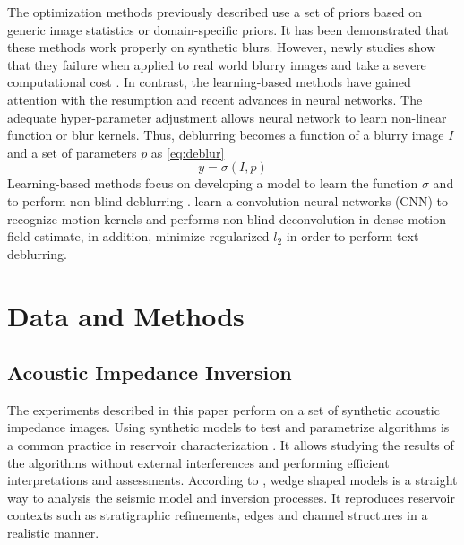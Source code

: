 \documentclass[conference]{IEEEtran}
\begin{document}
The optimization methods previously described use a set of priors based on
generic image statistics or domain-specific priors. It has been demonstrated
that these methods work properly on synthetic blurs. However, newly studies show that they failure
when applied to real world blurry images \cite{Lai2016} and take a severe computational cost \cite{Chakrabarti2016}.
In contrast, the learning-based methods have gained attention with the resumption and recent advances in neural
networks. The adequate hyper-parameter adjustment allows neural network to learn
non-linear function or blur kernels. Thus, deblurring becomes a function of a blurry image $I$
and a set of parameters $p$ as \eqref{eq:deblur}
\begin{equation}
 y = \sigma(I,p)
 \label{eq:deblur}
\end{equation}
Learning-based methods focus on developing a model to learn the function $\sigma$ \cite{Hradis2015}
and to perform non-blind deblurring \cite{Chakrabarti2016}. \cite{Sun2015} learn a convolution neural networks (CNN) to
recognize motion kernels and performs non-blind deconvolution in
dense motion field estimate, in addition, \cite{Hradis2015} minimize regularized $l_2$ 
in order to perform text deblurring.

\section{Data and Methods} \label{DMsection}
\subsection{Acoustic Impedance Inversion}
The experiments described in this paper perform
on a set of synthetic acoustic impedance images. Using synthetic models
to test and parametrize algorithms is a common practice in reservoir characterization \cite{Sergio2016}. It allows studying the
results of the algorithms without external interferences and performing efficient interpretations and assessments. 
According to \cite{Harvey}, wedge shaped models is a straight way to analysis the
seismic model and inversion processes. It reproduces
reservoir contexts such as stratigraphic refinements, edges and channel structures in a realistic manner.
\end{document}
